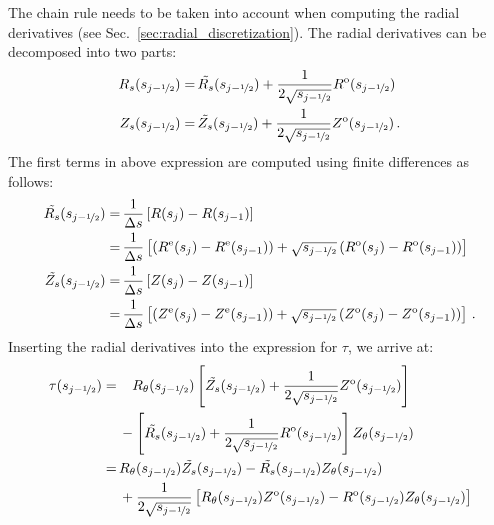 The chain rule needs to be taken into account when computing the radial derivatives (see Sec.~\ref{sec:radial_discretization}).
The radial derivatives can be decomposed into two parts:
\begin{align}
  R_s(s_{j-\nicefrac{1}{2}}) =&\, {\tilde{R_s}}(s_{j-\nicefrac{1}{2}}) + \frac{1}{2 \sqrt{s_{j-\nicefrac{1}{2}}}} R^\mathrm{o}(s_{j-\nicefrac{1}{2}}) \\
  Z_s(s_{j-\nicefrac{1}{2}}) =&\, {\tilde{Z_s}}(s_{j-\nicefrac{1}{2}}) + \frac{1}{2 \sqrt{s_{j-\nicefrac{1}{2}}}} Z^\mathrm{o}(s_{j-\nicefrac{1}{2}}) \, .
\end{align}
The first terms in above expression are computed using finite differences as follows:
\begin{align}
  {\tilde{R_s}}(s_{j-\nicefrac{1}{2}}) =&\, \frac{1}{\Delta s} \left[ R(s_j) - R(s_{j-1}) \right] \\
                             =&\, \frac{1}{\Delta s} \left[                      \left( R^\mathrm{e}(s_j) - R^\mathrm{e}(s_{j-1}) \right)
                                                            + \sqrt{s_{j-\nicefrac{1}{2}}} \left( R^\mathrm{o}(s_j) - R^\mathrm{o}(s_{j-1}) \right) \right] \\
  {\tilde{Z_s}}(s_{j-\nicefrac{1}{2}}) =&\, \frac{1}{\Delta s} \left[ Z(s_j) - Z(s_{j-1}) \right] \\
                             =&\, \frac{1}{\Delta s} \left[                      \left( Z^\mathrm{e}(s_j) - Z^\mathrm{e}(s_{j-1}) \right)
                                                            + \sqrt{s_{j-\nicefrac{1}{2}}} \left( Z^\mathrm{o}(s_j) - Z^\mathrm{o}(s_{j-1}) \right) \right] \, .
\end{align}
Inserting the radial derivatives into the expression for $\tau$, we arrive at:
\begin{align}
  \tau(s_{j-\nicefrac{1}{2}}) =&\, \phantom{-}\, R_\theta(s_{j-\nicefrac{1}{2}}) \left[ {\tilde{Z_s}}(s_{j-\nicefrac{1}{2}}) + \frac{1}{2 \sqrt{s_{j-\nicefrac{1}{2}}}} Z^\mathrm{o}(s_{j-\nicefrac{1}{2}}) \right] \nonumber \\
                    ~&\,          -    \left[ {\tilde{R_s}}(s_{j-\nicefrac{1}{2}}) + \frac{1}{2 \sqrt{s_{j-\nicefrac{1}{2}}}} R^\mathrm{o}(s_{j-\nicefrac{1}{2}}) \right] Z_\theta(s_{j-\nicefrac{1}{2}}) \nonumber \\
                    =&\,   R_\theta(s_{j-\nicefrac{1}{2}}) {\tilde{Z_s}}(s_{j-\nicefrac{1}{2}}) - {\tilde{R_s}}(s_{j-\nicefrac{1}{2}}) Z_\theta(s_{j-\nicefrac{1}{2}}) \nonumber \\
                    ~&\, + \frac{1}{2 \sqrt{s_{j-\nicefrac{1}{2}}}} \left[ R_\theta(s_{j-\nicefrac{1}{2}}) Z^\mathrm{o}(s_{j-\nicefrac{1}{2}}) - R^\mathrm{o}(s_{j-\nicefrac{1}{2}}) Z_\theta(s_{j-\nicefrac{1}{2}}) \right] \label{eqn:tau_almost}
\end{align}
